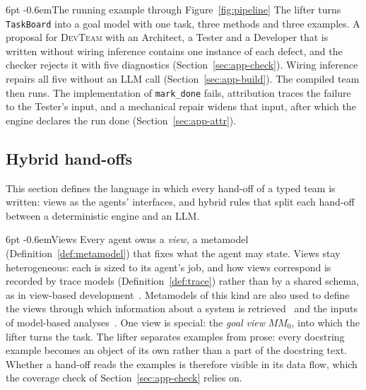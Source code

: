 \documentclass[pdflatex,sn-mathphys-num]{sn-jnl}
\makeatletter
\theoremstyle{thmstyleone}%
\theoremstyle{thmstyletwo}%
\theoremstyle{thmstylethree}%
\newcommand{\devteam}{\textsc{DevTeam}}
\newcommand{\MM}{\mathit{MM}}
\newcommand{\code}[1]{\texttt{#1}}
\renewcommand\paragraph{\@startsection{paragraph}{4}{\z@}%
  {6pt \@plus 2pt \@minus 1pt}{-0.6em}{\normalfont\normalsize\bfseries}}
\makeatother
\begin{document}
\paragraph{The running example through Figure~\ref{fig:pipeline}} The lifter
turns \code{TaskBoard} into a goal model with one task, three methods and three
examples. A proposal for \devteam{} with an Architect, a Tester and a Developer
that is written without wiring inference contains one instance of each defect,
and the checker rejects it with five diagnostics (Section~\ref{sec:app-check}).
Wiring inference repairs all five without an LLM call
(Section~\ref{sec:app-build}). The compiled team then runs.
The implementation of \code{mark\_done} fails, attribution traces the failure to
the Tester's input, and a mechanical repair widens that input, after which the
engine declares the run done (Section~\ref{sec:app-attr}).

\subsection{Hybrid hand-offs}\label{sec:app-handoffs}

This section defines the language in which every hand-off of a typed team is
written: views as the agents' interfaces, and hybrid rules that split each
hand-off between a deterministic engine and an LLM.

\paragraph{Views} Every agent owns a \emph{view}, a metamodel
(Definition~\ref{def:metamodel}) that fixes what the agent may state. Views stay
heterogeneous: each is sized to its agent's job, and how views correspond is
recorded by trace models (Definition~\ref{def:trace}) rather than by a shared
schema, as in view-based
development~\cite{klare2021vitruvius,bruneliere2019views}. Metamodels of this
kind are also used to define the views through which information about a system
is retrieved~\cite{kirschner2025retriever} and the inputs of model-based
analyses~\cite{cortellessa2022performance}. One view is special: the
\emph{goal view} $\MM_0$, into which the lifter turns the task. The lifter
separates examples from prose: every docstring example becomes an object of its
own rather than a part of the docstring text. Whether a hand-off reads the
examples is therefore visible in its data flow, which the coverage check of
Section~\ref{sec:app-check} relies on.
\end{document}
